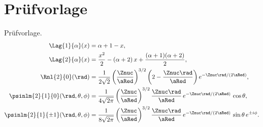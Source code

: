 \chapter{Prüfvorlage}\label{c11}

Prüfvorlage.
\begin{align}
  \Lag{1}{\alpha}(x) &= \alpha + 1 - x,
    \label{c11.eq.lag1} \\
  \Lag{2}{\alpha}(x) &= \frac{x^2}{2} - (\alpha + 2)\,x + \frac{(\alpha + 1)(\alpha + 2)}{2},
    \label{c11.eq.lag2} \\
  \Rnl{2}{0}(\rad) &= \frac{1}{2\sqrt{2}}\left(\frac{\Znuc}{\aRed}\right)^{3/2}\left(2 - \frac{\Znuc\rad}{\aRed}\right) e^{-\Znuc\rad/(2\aRed)},
    \label{c11.eq.r20} \\
  \psinlm{2}{1}{0}(\rad, \theta, \phi) &= \frac{1}{4\sqrt{2\pi}}\left(\frac{\Znuc}{\aRed}\right)^{3/2}\frac{\Znuc\rad}{\aRed}\,e^{-\Znuc\rad/(2\aRed)}\,\cos\theta,
    \label{c11.eq.psi210} \\
  \psinlm{2}{1}{\pm 1}(\rad, \theta, \phi) &= \frac{1}{8\sqrt{2\pi}}\left(\frac{\Znuc}{\aRed}\right)^{3/2}\frac{\Znuc\rad}{\aRed}\,e^{-\Znuc\rad/(2\aRed)}\,\sin\theta\,e^{\pm i\phi}.
    \label{c11.eq.psi21pm}
\end{align}
